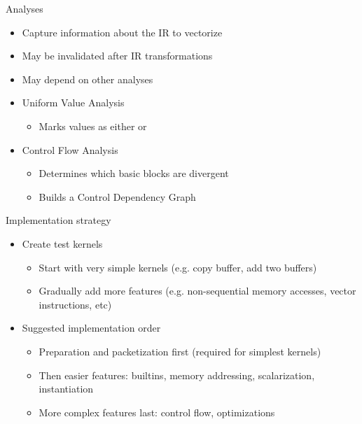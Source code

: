 \begin{frame}{Analyses}

\begin{itemize}
    \item Capture information about the IR to vectorize
    \item May be invalidated after IR transformations
    \item May depend on other analyses
\end{itemize}

\begin{itemize}
    \item Uniform Value Analysis
    \begin{itemize}
        \item Marks values as either  or 
    \end{itemize}

    \item Control Flow Analysis
    \begin{itemize}
        \item Determines which basic blocks are divergent
        \item Builds a Control Dependency Graph
    \end{itemize}
\end{itemize}

\end{frame}


\begin{frame}{Implementation strategy}

\begin{itemize}
    \item Create test kernels
    \begin{itemize}
        \item Start with very simple kernels (e.g. copy buffer, add two buffers)
        \item Gradually add more features (e.g. non-sequential memory accesses, vector instructions, etc)
    \end{itemize}

    
    \item Suggested implementation order
    \begin{itemize}
        \item Preparation and packetization first (required for simplest kernels)
        \item Then easier features: builtins, memory addressing, scalarization, instantiation
        \item More complex features last: control flow, optimizations
    \end{itemize}
\end{itemize}

\end{frame}

